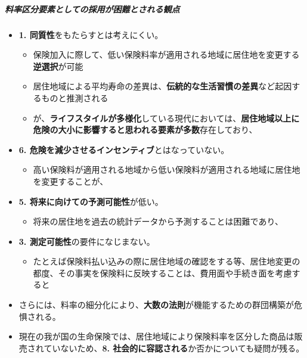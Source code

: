 \documentclass[]{article}
\begin{document}
\hypertarget{ux6599ux7387ux533aux5206ux8981ux7d20ux3068ux3057ux3066ux306eux63a1ux7528ux304cux56f0ux96e3ux3068ux3055ux308cux308bux89b3ux70b9}{%
\subparagraph{料率区分要素としての採用が困難とされる観点}\label{ux6599ux7387ux533aux5206ux8981ux7d20ux3068ux3057ux3066ux306eux63a1ux7528ux304cux56f0ux96e3ux3068ux3055ux308cux308bux89b3ux70b9}}

\begin{itemize}
\tightlist
\item
  \textbf{1. 同質性}をもたらすとは考えにくい。

  \begin{itemize}
  \tightlist
  \item
    保険加入に際して、低い保険料率が適用される地域に居住地を変更する\textbf{逆選択}が可能
  \item
    居住地域による平均寿命の差異は、\textbf{伝統的な生活習慣の差異}など起因するものと推測される
  \item
    が、\textbf{ライフスタイルが多様化}している現代においては、\textbf{居住地域以上に危険の大小に影響すると思われる要素が多数}存在しており、
  \end{itemize}
\item
  \textbf{6. 危険を減少させるインセンティブ}とはなっていない。

  \begin{itemize}
  \tightlist
  \item
    高い保険料が適用される地域から低い保険料が適用される地域に居住地を変更することが、
  \end{itemize}
\item
  \textbf{5. 将来に向けての予測可能性}が低い。

  \begin{itemize}
  \tightlist
  \item
    将来の居住地を過去の統計データから予測することは困難であり、
  \end{itemize}
\item
  \textbf{3. 測定可能性}の要件になじまない。

  \begin{itemize}
  \tightlist
  \item
    たとえば保険料払い込みの際に居住地域の確認をする等、居住地変更の都度、その事実を保険料に反映することは、費用面や手続き面を考慮すると
  \end{itemize}
\item
  さらには、料率の細分化により、\textbf{大数の法則}が機能するための群団構築が危惧される。
\item
  現在の我が国の生命保険では、居住地域により保険料率を区分した商品は販売されていないため、\textbf{8.
  社会的に容認される}か否かについても疑問が残る。
\end{itemize}
\end{document}
